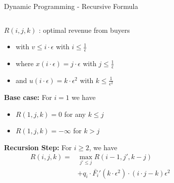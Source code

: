 \documentclass{beamer}
\begin{document}
\begin{frame}{Dynamic Programming - Recursive Formula}
  \begin{columns}
    \begin{column}{.7\textwidth}
      $R(i,j,k)$ : optimal revenue from buyers
      \begin{itemize}
        \item with $v \leq i \cdot \epsilon$ with $i \leq \frac{1}{\epsilon}$
        \item where $x(i \cdot \epsilon) = j \cdot \epsilon$ with $j \leq \frac{1}{\epsilon}$
        \item and $u(i \cdot \epsilon) = k \cdot \epsilon^2$ with $k \leq \frac{1}{\epsilon^2}$
      \end{itemize}

      \textbf{Base case:}
      For $i = 1$ we have
      \begin{itemize}
        \item $R(1,j,k) = 0$ for any $k \leq j$
        \item $R(1,j,k) = -\infty$ for $k > j$
      \end{itemize}

      \textbf{Recursion Step:}
      For $i \geq 2$, we have
      \begin{align*}
        R(i,j,k) = & \max_{j' \leq j} R(i-1, j', k-j) \\ &+ q_i \cdot \bar{F_i}'(k \cdot \epsilon^2)\cdot (i \cdot j - k)\epsilon^2
      \end{align*}
    \end{column}
    \begin{column}{.3\textwidth}
      \begin{center}
\end{center}
\end{column}
\end{columns}
\end{frame}
\end{document}
